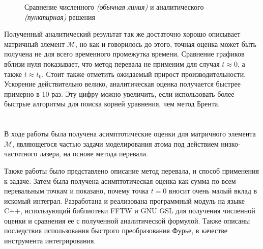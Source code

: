 \documentclass[%
bachelor,    %
natbib,      %
subf,        %
href,        %
colorlinks,  %
]{disser}
\newcommand{\sectionbreak}{\clearpage}
\newcommand{\cM}{\mathcal{M}}
\begin{document}
\begin{figure}[h]
	\caption{Сравнение численного \textit{(обычная линия)} и аналитического \textit{(пунктирная)} решения}
	\label{ris:end2}
\end{figure}

Полученный аналитический результат так же достаточно хорошо описывает матричный элемент $\cM$, но как и говорилось до этого, точная оценка может быть получена не для всего временного промежутка времени. Сравнение графиков вблизи нуля показывает, что метод перевала не применим для случая $t\approx 0$, а также $t\approx t_0$. 
Стоит также отметить ожидаемый прирост производительности. Ускорение действительно велико, аналитическая оценка получается быстрее примерно в 10 раз. Эту цифру можно увеличить, если использовать более быстрые алгоритмы для поиска корней уравнения, чем метод Брента.

\sectionbreak
\section*{}

В ходе работы была получена асимптотические оценки для матричного элемента $\cM$, являющегося частью задачи моделирования атома под действием низко-частотного лазера, на основе метода перевала. 

Также работы было представлено описание метод перевала, и способ применения к задаче. Затем была получена асимптотическая оценка как сумма по всем перевальным точкам и показано, почему точка $t = 0$ вносит очень малый вклад в искомый интеграл. Разработана и реализована программный модуль на языке C++, использующий библиотеки FFTW и GNU GSL для получения численной оценки и сравнения ее с полученной аналитической формулой. Также описаны последствия использования быстрого преобразования Фурье, в качестве инструмента интегрирования.
\end{document}
